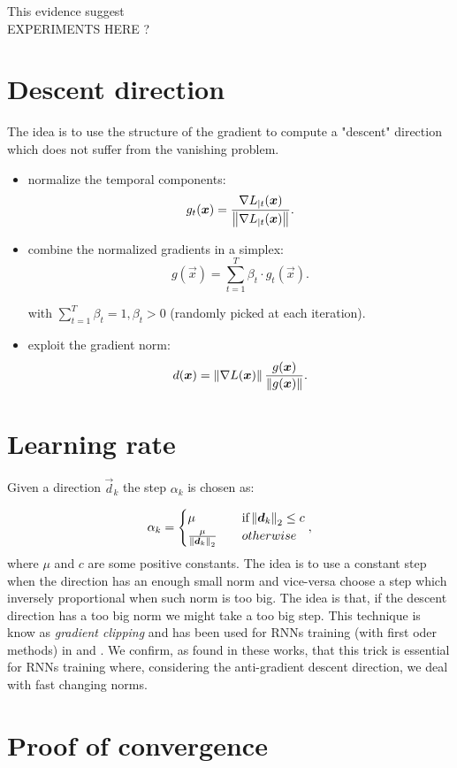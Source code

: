 This evidence suggest 
\\
EXPERIMENTS HERE ?

\section{Descent direction}

The idea is to use the structure of the gradient to compute a "descent" direction which does not suffer from the vanishing problem.
\begin{itemize}
	\item normalize the temporal components:
	\begin{equation}
	g_t(\boldsymbol{x}) = \frac{\nabla L_{|t}(\boldsymbol{x})}{\left\Vert \nabla L_{|t}(\boldsymbol{x}) \right\Vert}.
	\end{equation}
	
	\item combine the normalized gradients in a simplex:
	\begin{equation}
	g(\vec{x}) = \sum_{t=1}^T \beta_t \cdot g_t(\vec{x}).
	\end{equation}
	
	with $\sum_{t=1}^T\beta_t=1, \beta_t>0$ (randomly picked at each iteration).
	\item exploit the gradient norm:
	\begin{equation}
	d(\boldsymbol{x}) = \left\Vert \nabla L (\boldsymbol{x}) \right\Vert\frac{g(\boldsymbol{x})}{\left\Vert g(\boldsymbol{x}) \right\Vert}.
	\end{equation}
\end{itemize}
\section{Learning rate}

Given a direction $\vec{d}_k$ the step $\alpha_k$ is chosen as:

\begin{equation}
\alpha_k = 
\begin{cases}
	\mu \quad &\mbox{if} \left\Vert \boldsymbol{d}_k \right\Vert_2 \leq c\\
	\frac{\mu}{\left\Vert \boldsymbol{d}_k \right\Vert_2} \quad & otherwise
\end{cases},
\end{equation}
where $\mu$ and $c$ are some positive constants. The idea is to use a constant step when the direction has an enough small norm and vice-versa choose a step which inversely proportional when such norm is too big. The idea is that, if the descent direction has a too big norm we might take a too big step. This technique is know as \textit{gradient clipping} and has been used for RNNs training (with first oder methods) in \cite{pascanu} and \cite{mikolov}. We confirm, as found in these works, that this trick is essential for RNNs training where, considering the anti-gradient descent direction, we deal with fast changing norms.
\section{Proof of convergence}

